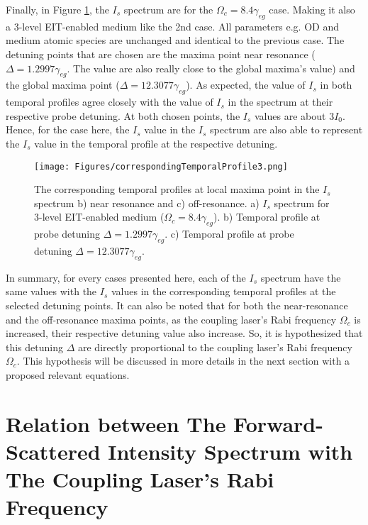 Finally, in Figure \ref{fig: corresponding temporal profile 3}, the $I_{s}$ spectrum are for the $\Omega_{c} = 8.4\gamma_{eg}$ case. Making it also a 3-level EIT-enabled medium like the 2nd case. All parameters e.g. OD and medium atomic species are unchanged and identical to the previous case. The detuning points that are chosen are the maxima point near resonance ($\Delta = 1.2997\gamma_{eg}$. The value are also really close to the global maxima's value) and the global maxima point ($\Delta = 12.3077\gamma_{eg}$). As expected, the value of $I_{s}$ in both temporal profiles agree closely with the value of $I_{s}$ in the spectrum at their respective probe detuning. At both chosen points, the $I_{s}$ values are about $3I_{0}$. Hence, for the case here, the $I_{s}$ value in the $I_{s}$ spectrum are also able to represent the $I_{s}$ value in the temporal profile at the respective detuning.

\begin{figure}[h!]
    \centering
    \texttt{[image: Figures/correspondingTemporalProfile3.png]}
    \caption{The corresponding temporal profiles at local maxima point in the $I_{s}$ spectrum b) near resonance and c) off-resonance. a) $I_{s}$ spectrum for 3-level EIT-enabled medium ($\Omega_{c} = 8.4\gamma_{eg}$). b) Temporal profile at probe detuning $\Delta = 1.2997\gamma_{eg}$. c) Temporal profile at probe detuning $\Delta = 12.3077\gamma_{eg}$.}
    \label{fig: corresponding temporal profile 3}
\end{figure}

In summary, for every cases presented here, each of the $I_{s}$ spectrum have the same values with the $I_{s}$ values in the corresponding temporal profiles at the selected detuning points. It can also be noted that for both the near-resonance and the off-resonance maxima points, as the coupling laser's Rabi frequency $\Omega_{c}$ is increased, their respective detuning value also increase. So, it is hypothesized that this detuning $\Delta$ are directly proportional to the coupling laser's Rabi frequency $\Omega_{c}$. This hypothesis will be discussed in more details in the next section with a proposed relevant equations.


\section{Relation between The Forward-Scattered Intensity Spectrum with The Coupling Laser's Rabi Frequency}

